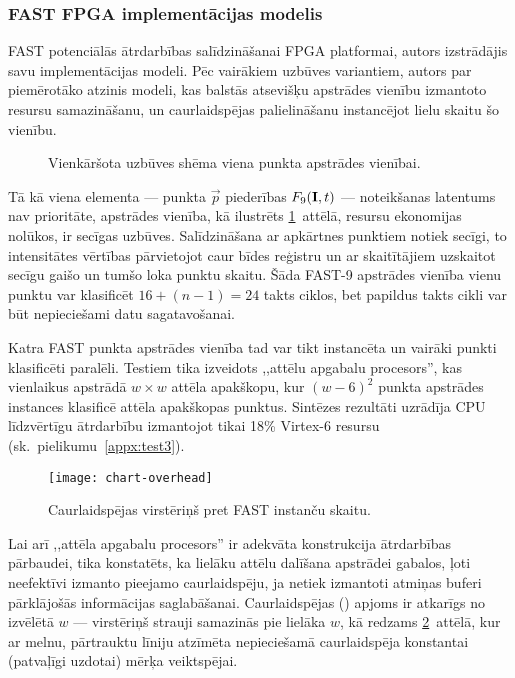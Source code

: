 \subsubsection{FAST FPGA implementācijas modelis} \label{sec:fast-fpga}
FAST potenciālās ātrdarbības salīdzināšanai FPGA platformai, autors
izstrādājis savu implementācijas modeli. Pēc vairākiem uzbūves variantiem,
autors par piemērotāko atzinis modeli, kas balstās atsevišķu apstrādes
vienību izmantoto resursu samazināšanu, un caurlaidspējas palielināšanu
instancējot lielu skaitu šo vienību.

\begin{figure}[tbh]
	\centering
	\def\svgwidth{\linewidth}
	{\small}
	\caption{Vienkāršota uzbūves shēma viena punkta apstrādes vienībai.}
	\label{fig:fast-fpga}
\end{figure}

Tā kā viena elementa --- punkta $\vec{p}$ piederības $F_9(\mathbf{I},t)$ ---
noteikšanas latentums nav prioritāte, apstrādes vienība, kā ilustrēts
\ref{fig:fast-fpga}~attēlā, resursu ekonomijas nolūkos, ir secīgas uzbūves.
Salīdzināšana ar apkārtnes punktiem notiek secīgi, to intensitātes vērtības
pārvietojot caur bīdes reģistru un ar skaitītājiem uzskaitot secīgu
gaišo un tumšo loka punktu skaitu. Šāda FAST-9 apstrādes vienība vienu punktu
var klasificēt $16+(n-1)=24$ takts ciklos, bet papildus takts cikli
var būt nepieciešami datu sagatavošanai.

Katra FAST punkta apstrādes vienība tad var tikt instancēta un vairāki
punkti klasificēti paralēli. Testiem tika izveidots
,,attēlu apgabalu procesors'', kas vienlaikus apstrādā $w \times w$ attēla
apakškopu, kur ${(w-6)}^2$ punkta apstrādes instances klasificē attēla
apakškopas punktus. Sintēzes rezultāti uzrādīja CPU līdzvērtīgu ātrdarbību
izmantojot tikai 18\% Virtex-6 resursu
(sk.~pielikumu~\ref{appx:test3}).

\begin{figure}[tbh]
	\centering
	\texttt{[image: chart-overhead]}
	\caption{Caurlaidspējas virstēriņš pret FAST instanču skaitu.}
	\label{fig:overhead}
\end{figure}
Lai arī ,,attēla apgabalu procesors'' ir adekvāta konstrukcija
ātrdarbības pārbaudei, tika konstatēts, ka lielāku attēlu dalīšana
apstrādei gabalos, ļoti neefektīvi izmanto pieejamo caurlaidspēju, ja
netiek izmantoti atmiņas buferi pārklājošās informācijas saglabāšanai.
Caurlaidspējas  () apjoms ir atkarīgs no
izvēlētā $w$ --- virstēriņš strauji samazinās pie lielāka $w$,
kā redzams \ref{fig:overhead}~attēlā, kur ar melnu, pārtrauktu līniju
atzīmēta nepieciešamā caurlaidspēja konstantai (patvaļīgi uzdotai)
mērķa veiktspējai.


